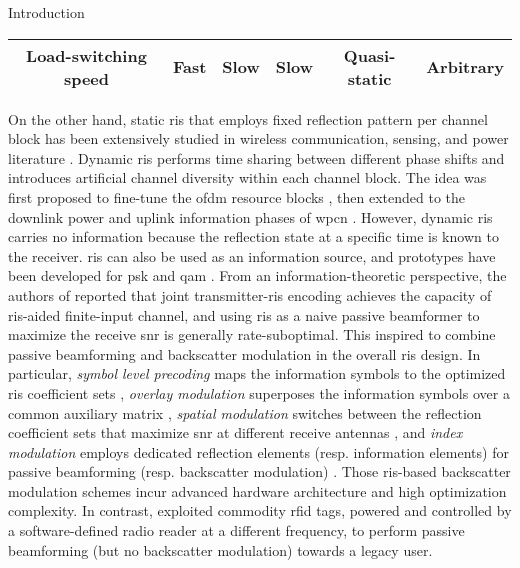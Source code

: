 \begin{section}{Introduction}
\begin{table*}[!t]
\begin{tabularx}{\textwidth}{CCCCCC}
			Load-switching speed                   & Fast                                    & Slow                        & Slow                                                                & Quasi-static        & Arbitrary                                                          \\ \bottomrule
		\end{tabularx}
	\end{table*}

	On the other hand, static \gls{ris} that employs fixed reflection pattern per channel block has been extensively studied in wireless communication, sensing, and power literature \cite{Wu2018,Zhang2019a,Lin2022,Liu2022,Feng2022,Zhao2022}.
	Dynamic \gls{ris} performs time sharing between different phase shifts and introduces artificial channel diversity within each channel block.
	The idea was first proposed to fine-tune the \gls{ofdm} resource blocks \cite{Yang2020}, then extended to the downlink power and uplink information phases of \gls{wpcn} \cite{Wu2021,Wu2021d,Hua2022a}.
	However, dynamic \gls{ris} carries no information because the reflection state at a specific time is known to the receiver.
	\gls{ris} can also be used as an information source, and prototypes have been developed for \gls{psk} \cite{Tang2019b} and \gls{qam} \cite{Dai2020a}.
	From an information-theoretic perspective, the authors of \cite{Karasik2020} reported that joint transmitter-\gls{ris} encoding achieves the capacity of \gls{ris}-aided finite-input channel, and using \gls{ris} as a naive passive beamformer to maximize the receive \gls{snr} is generally rate-suboptimal.
	This inspired \cite{Liu2019d,Bereyhi2020,Xu2020b,Zhang2021d,Hu2021b,Hua2022,Basar2020,Ma2020a,Yuan2021,Hu2021a} to combine passive beamforming and backscatter modulation in the overall \gls{ris} design.
	In particular, \emph{symbol level precoding} maps the information symbols to the optimized \gls{ris} coefficient sets \cite{Liu2019d,Bereyhi2020}, \emph{overlay modulation} superposes the information symbols over a common auxiliary matrix \cite{Xu2020b,Zhang2021d,Hu2021b,Hua2022}, \emph{spatial modulation} switches between the reflection coefficient sets that maximize \gls{snr} at different receive antennas \cite{Basar2020,Ma2020a,Yuan2021}, and \emph{index modulation} employs dedicated reflection elements (resp. information elements) for passive beamforming (resp. backscatter modulation) \cite{Hu2021a}.
	Those \gls{ris}-based backscatter modulation schemes incur advanced hardware architecture and high optimization complexity.
	In contrast, \cite{Vardakis2023} exploited commodity \gls{rfid} tags, powered and controlled by a software-defined radio reader at a different frequency, to perform passive beamforming (but no backscatter modulation) towards a legacy user. \label{cm:2.5}

\end{section}
